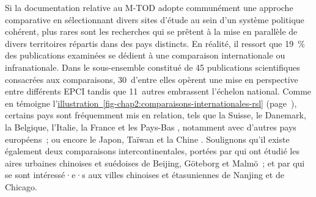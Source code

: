 \begin{refsegment}
Si la documentation relative au \acrshort{M-TOD} adopte communément une approche comparative en sélectionnant divers sites d'étude au sein d'un système politique cohérent, plus rares sont les recherches qui se prêtent à la mise en parallèle de divers territoires répartis dans des pays distincts. En réalité, il ressort que 19~\% des publications examinées se dédient à une comparaison internationale ou infranationale. Dans le sous-ensemble constitué de 45 publications scientifiques consacrées aux comparaisons, 30~d'entre elles opèrent une mise en perspective entre différents \acrshort{EPCI} tandis que 11~autres embrassent l'échelon national. Comme en témoigne l'\hyperref[fig-chap2:comparaisons-internationales-rsl]{illustration~\ref{fig-chap2:comparaisons-internationales-rsl}} (page~\pageref{fig-chap2:comparaisons-internationales-rsl}), certains pays sont fréquemment mis en relation, tels que la Suisse, le Danemark, la Belgique, l'Italie, la France et les Pays-Bas \textcolor{blue}{\autocites[29-46]{abours_rapport_2015}[279-285]{sebban_complementarite_2003}[282-284]{martens_bicycle_2004}}, notamment avec d'autres pays européens~; ou encore le Japon, Taïwan et la Chine \textcolor{blue}{\autocite[212]{lin_built_2018}}. Soulignons qu'il existe également deux comparaisons intercontinentales, portées par \textcolor{blue}{\textcite[4]{hamidi_shaping_2020}} qui ont étudié les aires urbaines chinoises et suédoises de Beijing, Göteborg et Malmö~; et par \textcolor{blue}{\textcite[13]{hua_transfer_2022}} qui se sont intéressé·e·s aux villes chinoises et étasuniennes de Nanjing et de Chicago.%


\end{refsegment}

